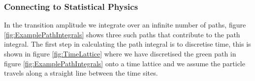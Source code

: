 \documentclass[12pt]{article}
\begin{document}
        \subsubsection{Connecting to Statistical Physics}
        In the transition amplitude we integrate over an infinite number of paths, figure \ref{fig:ExamplePathIntegrals} shows three such paths that contribute to the path integral. The first step in calculating the path integral is to discretise time, this is shown in figure \ref{fig:TimeLattice} where we have discretised the green path in figure \ref{fig:ExamplePathIntegrals} onto a time lattice and we assume the particle travels along a straight line between the time sites.
        \begin{figure}
            \centering
            \begin{tikzpicture}[scale=0.5, every node/.style={transform shape}]
                

\end{tikzpicture}
\end{figure}
\end{document}
